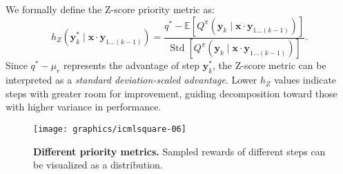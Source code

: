 We formally define the Z-score priority metric as:
\begin{equation*}
    h_Z(\boldsymbol{y}^*_k \mid \boldsymbol{x} \cdot \boldsymbol{y}_{1...(k-1)}) = \frac{q^* - \mathbb{E}[Q^\pi(\boldsymbol{y}_k \mid \boldsymbol{x} \cdot \boldsymbol{y}_{1...(k-1)})]}{\operatorname{Std}[Q^\pi(\boldsymbol{y}_k \mid \boldsymbol{x} \cdot \boldsymbol{y}_{1...(k-1)})]}.
\end{equation*}
Since $q^* - \mu_r$ represents the advantage of step $\boldsymbol{y}^*_k$, the Z-score metric can be interpreted as a \emph{standard deviation-scaled advantage}. Lower $h_Z$ values indicate steps with greater room for improvement, guiding decomposition toward those with higher variance in performance.

\begin{figure}
    \centering
\vspace{-0.3cm}      \texttt{[image: graphics/icmlsquare-06]}
    \vspace{-0.3cm}  
    \caption{\textbf{Different priority metrics.} Sampled rewards of different steps can be visualized as a distribution.}
    \label{fig:priority_metrics}
\vspace{-0.6cm}  
\end{figure}






